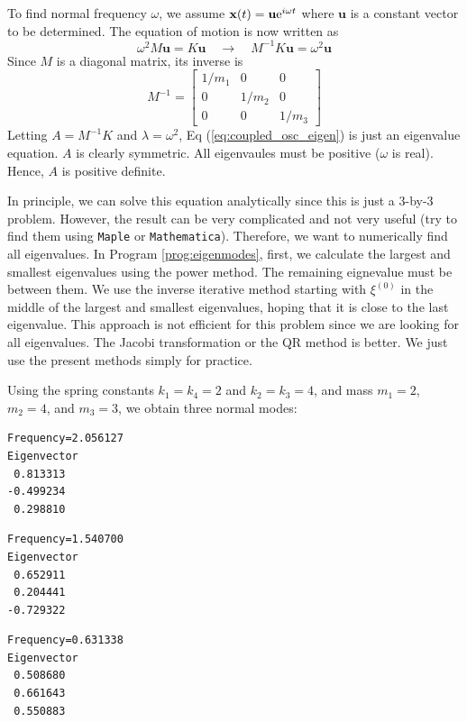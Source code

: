 {To find normal frequency $\omega$, we assume $\mathbf{x}(t) = \mathbf{u} \text{e}^{i \omega t}$ where $\mathbf{u}$ is a constant vector to be determined.  The equation of motion is now written as
\begin{equation}\label{eq:coupled_osc_eigen}
 \omega^2 M \mathbf{u} = K \mathbf{u}  \quad \rightarrow \quad M^{-1} K \mathbf{u} = \omega^2 \mathbf{u}
\end{equation}
Since $M$ is a diagonal matrix, its inverse is
\begin{equation}
M^{-1} = \begin{bmatrix}
1/m_1 & 0 & 0 \\ 0 & 1/m_2& 0 \\ 0 & 0 & 1/m_3
\end{bmatrix}
\end{equation}
Letting $A=M^{-1} K$ and $\lambda=\omega^2$, Eq (\ref{eq:coupled_osc_eigen}) is just an eigenvalue equation.  $A$ is clearly symmetric.  All eigenvaules must be positive ($\omega$ is real). Hence, $A$ is positive definite.

In principle, we can solve this equation analytically since this is just a 3-by-3 problem.  However, the result can be very complicated and not very useful (try to find them using \texttt{Maple} or \texttt{Mathematica}).  Therefore, we want to numerically find all eigenvalues. In Program \ref{prog:eigenmodes},  first, we calculate the largest and smallest eigenvalues using the power method.  The remaining eignevalue must be between them. We use the inverse iterative method starting with $\xi^{(0)}$ in the middle of the largest and smallest eigenvalues, hoping that it is close to the last eigenvalue.  This approach is not efficient for this problem since we are looking for all eigenvalues.  The Jacobi transformation or the QR method is better.  We just use the present methods simply for practice. 

Using the spring constants $k_1=k_4=2$ and $k_2=k_3=4$, and mass $m_1=2$, $m_2=4$, and $m_3=3$, we obtain three normal modes:
\begin{center}
\small
\begin{minipage}{1.8in}
\begin{Verbatim}[frame=single]
Frequency=2.056127 
Eigenvector
 0.813313
-0.499234
 0.298810
\end{Verbatim}
\end{minipage}
\hspace{0.2in}
\begin{minipage}{1.8in}
\begin{Verbatim}[frame=single]
Frequency=1.540700 
Eigenvector
 0.652911
 0.204441
-0.729322
\end{Verbatim}
\end{minipage}
\hspace{0.2in}
\begin{minipage}{1.8in}
\begin{Verbatim}[frame=single]
Frequency=0.631338 
Eigenvector
 0.508680
 0.661643
 0.550883
\end{Verbatim}
\end{minipage}
\normalsize
\end{center}

}
